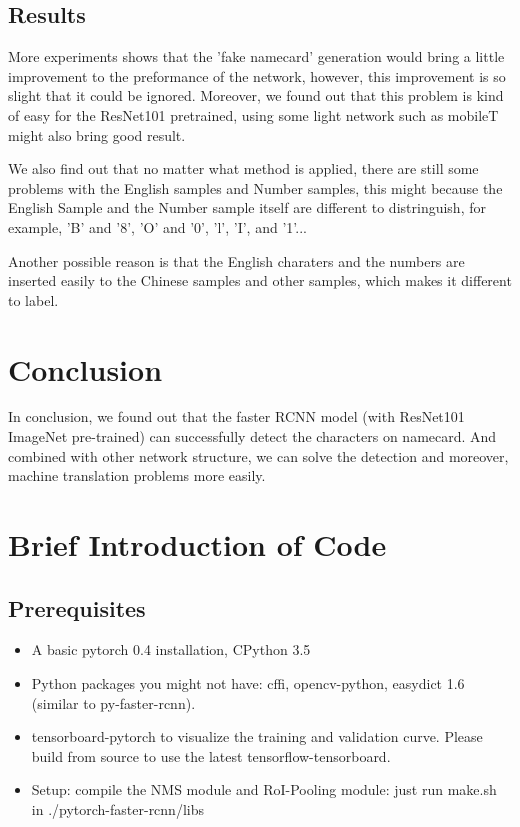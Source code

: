 \documentclass{IEEEtran}
\begin{document}
\subsection{Results}
More experiments shows that the 'fake namecard' generation would bring a little improvement to the preformance of 
the network, however, this improvement is so slight that it could be ignored. Moreover, we found out that this 
problem is kind of easy for the ResNet101 pretrained, using some light network such as mobileT might also bring 
good result.

We also find out that no matter what method is applied, there are still some problems with the English samples and Number samples, this might because the English Sample and the Number sample itself are different to distringuish, for example, 'B' and '8', 'O' and '0', 'l', 'I', and '1'...

Another possible reason is that the English charaters and the numbers are inserted easily to the Chinese samples and other samples, which makes it different to label.

\section{Conclusion}

In conclusion, we found out that the faster RCNN model (with ResNet101 ImageNet pre-trained) can successfully detect the characters on namecard. And combined with other network structure, we can solve the detection and moreover, machine translation problems more easily.

\section{Brief Introduction of Code}

\subsection{Prerequisites}
\begin{itemize}
\item{A basic pytorch 0.4 installation, CPython 3.5}

\item{Python packages you might not have: cffi, opencv-python, easydict 1.6 (similar to py-faster-rcnn).}

\item{tensorboard-pytorch to visualize the training and validation curve. Please build from source to use the latest tensorflow-tensorboard.}

\item{Setup: compile the NMS module and RoI-Pooling module: just run make.sh in ./pytorch-faster-rcnn/libs}
\end{itemize}
\end{document}
